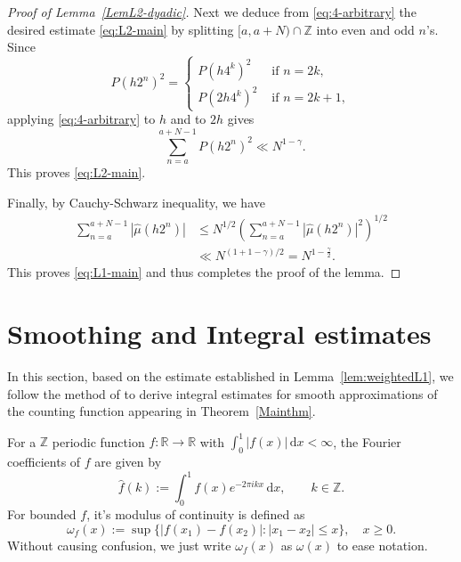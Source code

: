\documentclass[10pt,a4paper]{amsart}
\numberwithin{equation}{section} %
\newcommand{\Z}{\mathbb{Z}}
\begin{document}
\begin{proof}[Proof of Lemma~\ref{LemL2-dyadic}]
Next we deduce from \eqref{eq:4-arbitrary} the desired estimate \eqref{eq:L2-main} by splitting $[a,a+N)\cap\mathbb{Z}$ into even and odd $n$'s.   Since 
	\[
	P(h2^n)^2=\begin{cases}P(h4^k)^2 & \text{ if } n=2k,\\
	P(2h4^k)^2 &\text{ if } n=2k+1,
	\end{cases}
	\]
 applying \eqref{eq:4-arbitrary} to $h$ and to $2h$ gives
\begin{equation*}
\sum_{n=a}^{a+N-1}P(h2^n)^2\ll N^{1-\gamma}.
\end{equation*}
This proves \eqref{eq:L2-main}.
	
Finally, by Cauchy-Schwarz inequality, we have 
	\[
	\begin{aligned}
		\sum_{n=a}^{a+N-1}|\widehat\mu(h2^n)|
		&\leq N^{1/2}
		\left(\sum_{n=a}^{a+N-1}|\widehat\mu(h2^n)|^2\right)^{1/2} \\
		&\ll N^{(1+1-\gamma)/2}=N^{1-\frac{\gamma}{2}}.
	\end{aligned}
	\]
	This proves \eqref{eq:L1-main} and thus completes the proof of the lemma.
\end{proof}

 


















\section{Smoothing and Integral estimates}\label{S3}


In this section, based on the estimate established in %
Lemma~\ref{lem:weightedL1},  we follow the method of \cite[Section 2.2]{Baker25A} to  derive integral estimates for smooth approximations of the counting function appearing in Theorem~\ref{Mainthm}.  

For a $\mathbb{Z}$ periodic function $f:\mathbb{R}\to\mathbb{R}$ with $\int_{0}^{1}|f(x)|\, \mathrm{d} x<\infty$, the Fourier coefficients of $f$ are given by 
\begin{equation*}
	\label{Fouriertransform2}
	\widehat{f}(k):=\int_{0}^{1}f(x)e^{-2\pi i k x}\, \mathrm{d} x,  \qquad k\in\Z.
\end{equation*}  
For bounded $f$, it's modulus of continuity is defined as
$$\omega_{f}(x):=\sup\{|f(x_{1})-f(x_{2})|:|x_{1}-x_{2}|\leq x\},\quad x\geq0.$$
Without causing confusion, we just write $\omega_{f}(x)$ as $\omega(x)$ to ease notation.
\end{document}
